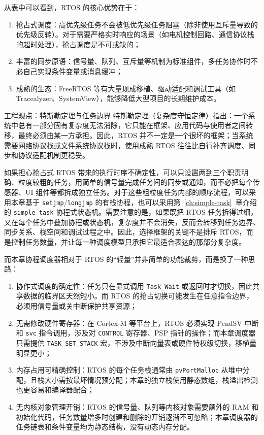 从表中可以看到，RTOS 的核心优势在于：

\begin{enumerate}
	\item 抢占式调度：高优先级任务不会被低优先级任务阻塞（除非使用互斥量导致的优先级反转）。对于需要严格实时响应的场景（如电机控制回路、通信协议栈的超时处理），抢占调度是不可或缺的；
	\item 丰富的同步原语：信号量、队列、互斥量等机制为标准组件，多任务协作时不必自己实现条件变量或消息缓冲；
	\item 成熟的生态：FreeRTOS 等有大量现成移植、驱动适配和调试工具（如 Tracealyzer、SystemView），能够降低大型项目的长期维护成本。
\end{enumerate}

\begin{anybox}{工程观点：特斯勒定理与任务边界}
特斯勒定理（复杂度守恒定律）指出：一个系统中总有一部分固有复杂度无法消除，它只能在框架、应用代码与使用者之间转移，最终必须由某一方承担。因此，RTOS 并不一定是一个很坏的框架；当系统需要网络协议栈或文件系统协议栈时，使用成熟 RTOS 往往比自行补齐调度、同步和协议适配机制更稳妥。

如果担心抢占式 RTOS 带来的执行时序不确定性，可以只设置两到三个职责明确、粒度较粗的任务，用简单的信号量完成任务间的同步或通知，而不必把每个传感器、UI 组件等都拆成独立任务。对于这些粗粒度任务内部的顺序流程，可以采用本章基于 \texttt{setjmp}/\texttt{longjmp} 的有栈协程，也可以采用第~\ref{ch:simple-task}~章介绍的 \texttt{simple\_task} 协程式状态机。需要注意的是，如果既把 RTOS 任务拆得过细，又在每个任务中叠加协程或状态机，复杂度并不会消失，反而会转移到任务边界、同步关系、栈空间和调试过程之中。因此，选择框架的关键不是排斥 RTOS，而是控制任务数量，并让每一种调度模型只承担它最适合表达的那部分复杂度。
\end{anybox}

而本章协程调度器相对于 RTOS 的“轻量”并非简单的功能裁剪，而是换了一种思路：

\begin{enumerate}
	\item 协作式调度的确定性：任务只在显式调用 \texttt{Task\_Wait} 或返回时才切换，因此共享数据的临界区天然短小。而 RTOS 的抢占切换可能发生在任意指令边界，必须用信号量或关中断保护共享资源；
	\item 无需修改硬件寄存器：在 Cortex-M 等平台上，RTOS 必须实现 PendSV 中断和 \texttt{svc} 指令调用，涉及对 \texttt{CONTROL} 寄存器、PSP 指针的操作；而本章调度器只需提供 \texttt{TASK\_SET\_STACK} 宏，不涉及中断向量表或硬件特权级切换，移植量明显更小；
	\item 内存占用可精确控制：RTOS 的每个任务栈通常由 \texttt{pvPortMalloc} 从堆中分配，且栈大小需按最坏情况预分配；本章的独立栈使用静态数组，栈溢出检测也更容易和编译器配合；
	\item 无内核对象管理开销：RTOS 的信号量、队列等内核对象需要额外的 RAM 和初始化代码，任务数量增多时创建和删除的开销逐渐不可忽略；本章调度器的任务链表和条件变量均为静态结构，没有动态内存分配。
\end{enumerate}

